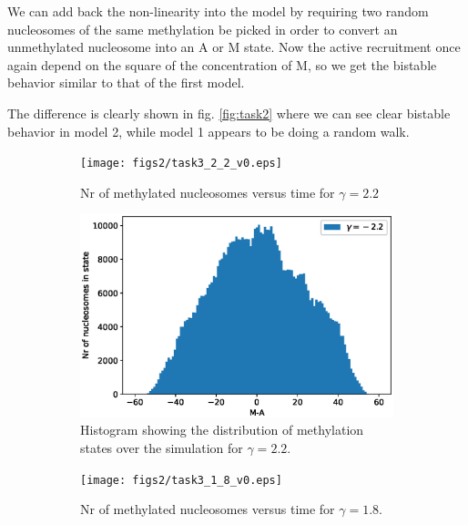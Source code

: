 \documentclass[fleqn,10pt]{SelfArx} %
\begin{document}
We can add back the non-linearity into the model by requiring two random nucleosomes of the same methylation be picked in order to convert an unmethylated nucleosome into an A or M state. Now the active recruitment once again depend on the square of the concentration of M, so we get the bistable behavior similar to that of the first model. 

The difference is clearly shown in fig. \eqref{fig:task2} where we can see clear bistable behavior in model 2, while model 1 appears to be doing a random walk. 


\begin{figure}[ht!]
	\centering
	\begin{subfigure}[b]{.49\textwidth}
		\centering
		\texttt{[image: figs2/task3\_2\_2\_v0.eps]}
		\caption{Nr of methylated nucleosomes versus time for $\gamma=2.2$ }
		\label{fig:task3_m_vs_t_2_2}
	\end{subfigure}
	\begin{subfigure}[b]{.49\textwidth}
		\centering
		\includegraphics[width= \linewidth]{figs2/task3_hist_2_2_v0.eps}
		\caption{Histogram showing the distribution of methylation states over the simulation for $\gamma=2.2$.}
		\label{fig:task3_hist_2_2}
	\end{subfigure}
	\begin{subfigure}[b]{.49\textwidth}
		\centering
		\texttt{[image: figs2/task3\_1\_8\_v0.eps]}
		\caption{Nr of methylated nucleosomes versus time for $\gamma=1.8$.}
		\label{fig:task3_m_vs_t_1_8}
	\end{subfigure}
	\begin{subfigure}[b]{.49\textwidth}
		\centering

\end{subfigure}
\end{figure}
\end{document}
